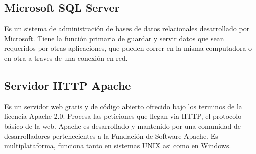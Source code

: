 \subsection{Microsoft SQL Server}

Es un sistema de administración de bases de datos relacionales desarrollado por Microsoft. Tiene la función primaria de guardar y servir datos  que sean requeridos por otras aplicaciones, que pueden correr en la misma computadora o en otra a traves de una conexión en red.

\subsection{Servidor HTTP Apache}

Es un servidor web gratis y de código abierto ofrecido bajo los terminos de la licencia Apache 2.0. Procesa las peticiones que llegan via HTTP, el protocolo básico de la web. Apache es desarrollado y mantenido  por una comunidad de desarrolladores pertenecientes a la Fundación de Software Apache. Es multiplataforma, funciona tanto en sistemas UNIX asi como en Windows.


